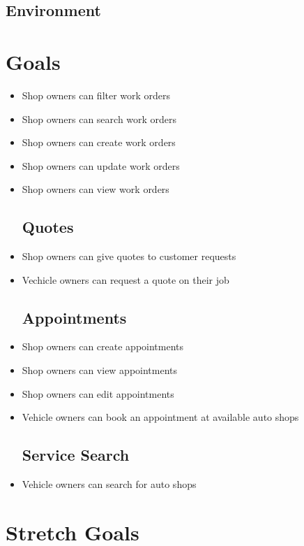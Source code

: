 \documentclass{article}
\begin{document}
\subsection{Environment}


\section{Goals}
\begin{itemize}
\subsection{Work Orders}
\item Shop owners can filter work orders
\item Shop owners can search work orders
\item Shop owners can create work orders
\item Shop owners can update work orders
\item Shop owners can view work orders
\subsection{Quotes}
\item Shop owners can give quotes to customer requests
\item Vechicle owners can request a quote on their job
\subsection{Appointments}
\item Shop owners can create appointments 
\item Shop owners can view appointments 
\item Shop owners can edit appointments 
\item Vehicle owners can book an appointment at available auto shops
\subsection{Service Search}
\item Vehicle owners can search for auto shops
\end{itemize}

\section{Stretch Goals}
\end{document}
